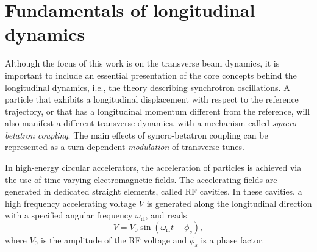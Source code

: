 
\section{Fundamentals of longitudinal dynamics} \label{sec:acc:longitudinal_dynamics}

Although the focus of this work is on the transverse beam dynamics, it is important to include an essential presentation of the core concepts behind the longitudinal dynamics, i.e., the theory describing synchrotron oscillations. A particle that exhibits a longitudinal displacement with respect to the reference trajectory, or that has a longitudinal momentum different from the reference, will also manifest a different transverse dynamics, with a mechanism called \textit{syncro-betatron coupling}. The main effects of syncro-betatron coupling can be represented as a turn-dependent \textit{modulation} of transverse tunes.

In high-energy circular accelerators, the acceleration of particles is achieved via the use of time-varying electromagnetic fields. The accelerating fields are generated in dedicated straight elements, called RF cavities. In these cavities, a high frequency accelerating voltage $V$ is generated along the longitudinal direction with a specified angular frequency $\omega_{\mathrm{rf}}$, and reads
\begin{equation}
    V=V_0 \sin \left(\omega_{\mathrm{rf}} t+\phi_s\right),
\end{equation}
where $V_0$ is the amplitude of the RF voltage and $\phi_s$ is a phase factor.

